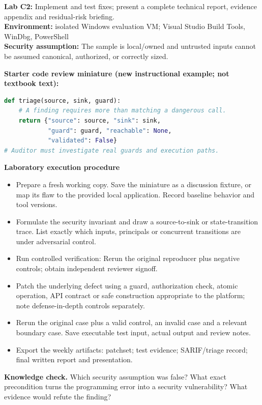 \documentclass[10pt,letterpaper]{article}
\begin{document}
\begin{insight}\textbf{Lab C2:} Implement and test fixes; present a complete technical report, evidence appendix and residual-risk briefing.\\\textbf{Environment:} isolated Windows evaluation VM; Visual Studio Build Tools, WinDbg, PowerShell\\\textbf{Security assumption:} The sample is local/owned and untrusted inputs cannot be assumed canonical, authorized, or correctly sized.\end{insight}
\textbf{Starter code review miniature (new instructional example; not textbook text):}
\begin{lstlisting}[language=Python]
def triage(source, sink, guard):
    # A finding requires more than matching a dangerous call.
    return {"source": source, "sink": sink,
            "guard": guard, "reachable": None,
            "validated": False}
# Auditor must investigate real guards and execution paths.
\end{lstlisting}
\textbf{Laboratory execution procedure}
\begin{itemize}[leftmargin=*,itemsep=2pt]
\item Prepare a fresh working copy. Save the miniature as a discussion fixture, or map its flaw to the provided local application. Record baseline behavior and tool versions.
\item Formulate the security invariant and draw a source-to-sink or state-transition trace. List exactly which inputs, principals or concurrent transitions are under adversarial control.
\item Run controlled verification: Rerun the original reproducer plus negative controls; obtain independent reviewer signoff.
\item Patch the underlying defect using a guard, authorization check, atomic operation, API contract or safe construction appropriate to the platform; note defense-in-depth controls separately.
\item Rerun the original case plus a valid control, an invalid case and a relevant boundary case. Save executable test input, actual output and review notes.
\item Export the weekly artifacts: patchset; test evidence; SARIF/triage record; final written report and presentation.
\end{itemize}
\textbf{Knowledge check.} Which security assumption was false? What exact precondition turns the programming error into a security vulnerability? What evidence would refute the finding?
\end{document}
